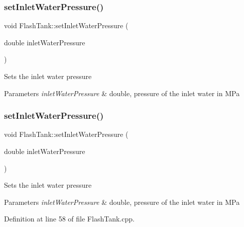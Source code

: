 \subsubsection{\texorpdfstring{set\+Inlet\+Water\+Pressure()}{setInletWaterPressure()}\hspace{0.1cm}{\footnotesize\ttfamily [1/3]}}
{\footnotesize\ttfamily void Flash\+Tank\+::set\+Inlet\+Water\+Pressure (\begin{DoxyParamCaption}\item[{double}]{inlet\+Water\+Pressure }\end{DoxyParamCaption})}

Sets the inlet water pressure 
\begin{DoxyParams}{Parameters}
{\em inlet\+Water\+Pressure} & double, pressure of the inlet water in M\+Pa \\
\hline
\end{DoxyParams}
\mbox{\label{class_flash_tank_aed0991a7902401d110fb2f4b472326f5}} 
\subsubsection{\texorpdfstring{set\+Inlet\+Water\+Pressure()}{setInletWaterPressure()}\hspace{0.1cm}{\footnotesize\ttfamily [2/3]}}
{\footnotesize\ttfamily void Flash\+Tank\+::set\+Inlet\+Water\+Pressure (\begin{DoxyParamCaption}\item[{double}]{inlet\+Water\+Pressure }\end{DoxyParamCaption})}

Sets the inlet water pressure 
\begin{DoxyParams}{Parameters}
{\em inlet\+Water\+Pressure} & double, pressure of the inlet water in M\+Pa \\
\hline
\end{DoxyParams}


Definition at line 58 of file Flash\+Tank.\+cpp.

\mbox{\label{class_flash_tank_aed0991a7902401d110fb2f4b472326f5}} 
